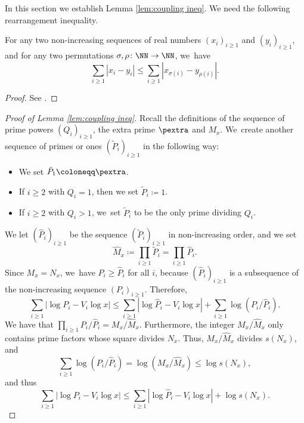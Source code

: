 In this section we establish Lemma \ref{lem:coupling ineq}.
We need the following rearrangement inequality.

\begin{lem}
\label{lem:rearrangement-ineq}
For any two non-increasing sequences of real numbers $(x_i)_{i \ge 1}$ and $(y_i)_{i \ge 1}$, and for any two permutations $\sigma, \rho \colon \NN \to \NN$, we~have
\[
\sum_{i \ge 1} |x_i - y_i| \le \sum_{i \ge 1} |x_{\sigma(i)} - y_{\rho(i)}|.
\]
\end{lem}

\begin{proof} See \cite[Lem.\,3.2]{ABT06}.
\end{proof}

\begin{proof}[Proof of Lemma \ref{lem:coupling ineq}]
Recall the definitions of the sequence of prime powers $(Q_i)_{i \ge 1}$, the extra prime $\pextra$ and $M_x$. We~create another sequence of primes or ones $(\tilde P_i)_{i \ge 1}$ in the following way:
\begin{itemize}
\item We set $\tilde P_1 \coloneqq \pextra$.

\item If $i \ge 2$ with $Q_i = 1$, then we set $\tilde P_i \coloneqq 1$.

\item If $i \ge 2$ with $Q_i > 1$, we~set $\tilde P_i$ to be the only prime dividing $Q_i$.
\end{itemize}
We let $(\hat P_i)_{i\ge1}$ be the sequence $(\tilde{P}_i)_{i\ge1}$ in non-increasing order, and we set
\[
\hat M_x \coloneqq \prod_{i\ge1} \tilde{P}_i = \prod_{i\ge1} \hat P_i.
\]
Since $M_x=N_x$, we~have $P_i \ge \hat P_i$ for all $i$, because $(\hat P_i)_{i \ge 1}$ is a subsequence of the non-increasing sequence $(P_i)_{i \ge 1}$. Therefore,
\[
\sum_{i \ge 1} |{\log P_i - V_i\log x}|\le \sum_{i \ge 1} |{\log \hat P_i - V_i\log x}| + \sum_{i \ge 1} \log(P_i/\hat P_i).
\]
We have that $\prod_{i \ge 1} P_i/\hat P_i = M_x/\hat M_x$. Furthermore, the integer $M_x/\hat M_x$ only contains prime factors whose square divides $N_x$. Thus, $M_x/\hat M_x$ divides $s(N_x)$, and
\begin{equation}
\label{eq:l1 dist reduction 1}
\sum_{i \ge 1} \log(P_i/\hat P_i) = \log(M_x/\hat M_x) \le \log s(N_x),
\end{equation}
and thus
\begin{equation}
\label{eq:l1 dist reduction 2}
\sum_{i \ge 1} |{\log P_i - V_i\log x}|\le \sum_{i \ge 1} |{\log \hat P_i - V_i\log x}| + \log s(N_x).
\end{equation}


\end{proof}

